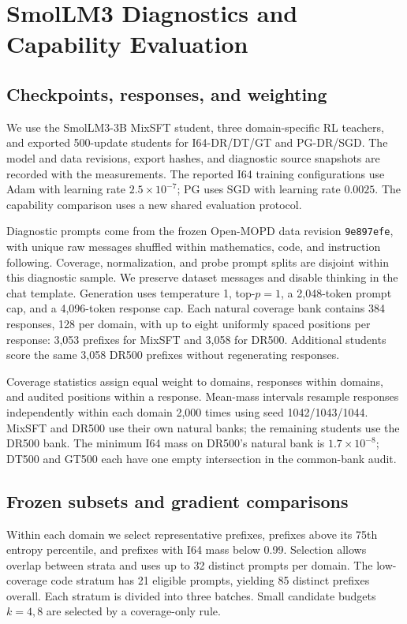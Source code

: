 \section{SmolLM3 Diagnostics and Capability Evaluation}
\label{app:smollm_diagnostics}

\subsection{Checkpoints, responses, and weighting}

We use the SmolLM3-3B MixSFT student, three domain-specific RL teachers, and exported 500-update students for I64-DR/DT/GT and PG-DR/SGD. The model and data revisions, export hashes, and diagnostic source snapshots are recorded with the measurements. The reported I64 training configurations use Adam with learning rate $2.5\times10^{-7}$; PG uses SGD with learning rate $0.0025$. The capability comparison uses a new shared evaluation protocol.

Diagnostic prompts come from the frozen Open-MOPD data revision \texttt{9e897efe}, with unique raw messages shuffled within mathematics, code, and instruction following. Coverage, normalization, and probe prompt splits are disjoint within this diagnostic sample. We preserve dataset messages and disable thinking in the chat template. Generation uses temperature 1, top-$p=1$, a 2,048-token prompt cap, and a 4,096-token response cap. Each natural coverage bank contains 384 responses, 128 per domain, with up to eight uniformly spaced positions per response: 3,053 prefixes for MixSFT and 3,058 for DR500. Additional students score the same 3,058 DR500 prefixes without regenerating responses.

Coverage statistics assign equal weight to domains, responses within domains, and audited positions within a response. Mean-mass intervals resample responses independently within each domain 2,000 times using seed 1042/1043/1044. MixSFT and DR500 use their own natural banks; the remaining students use the DR500 bank. The minimum I64 mass on DR500's natural bank is $1.7\times10^{-8}$; DT500 and GT500 each have one empty intersection in the common-bank audit.

\subsection{Frozen subsets and gradient comparisons}

Within each domain we select representative prefixes, prefixes above its 75th entropy percentile, and prefixes with I64 mass below 0.99. Selection allows overlap between strata and uses up to 32 distinct prompts per domain. The low-coverage code stratum has 21 eligible prompts, yielding 85 distinct prefixes overall. Each stratum is divided into three batches. Small candidate budgets $k=4,8$ are selected by a coverage-only rule.

